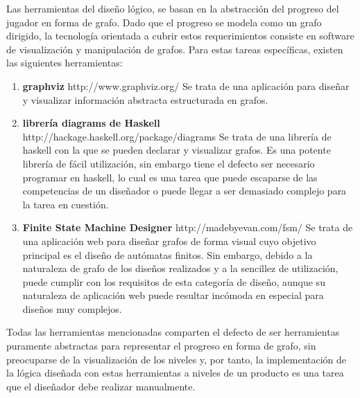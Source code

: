 Las herramientas del diseño lógico, se basan en la abstracción del progreso del jugador en forma de grafo.
Dado que el progreso se modela como un grafo dirigido, la tecnología orientada a cubrir estos requerimientos consiste en software de visualización y manipulación de grafos. Para estas tareas específicas, existen las siguientes herramientas:
\begin{enumerate}
	\item \textbf{graphviz} http://www.graphviz.org/ Se trata de una aplicación para diseñar y visualizar información abstracta estructurada en grafos.
	\item \textbf{librería diagrams de Haskell} http://hackage.haskell.org/package/diagrams Se trata de una librería de haskell con la que se pueden declarar y visualizar grafos. Es una potente librería de fácil utilización, sin embargo tiene el defecto ser necesario programar en haskell, lo cual es una tarea que puede escaparse de las competencias de un diseñador o puede llegar a ser demasiado complejo para la tarea en cuestión.
	\item \textbf{Finite State Machine Designer} http://madebyevan.com/fsm/ Se trata de una aplicación web para diseñar grafos de forma visual cuyo objetivo principal es el diseño de autómatas finitos. Sin embargo, debido a la naturaleza de grafo de los diseños realizados y a la sencillez de utilización, puede cumplir con los requisitos de esta categoría de diseño, aunque su naturaleza de aplicación web puede resultar incómoda en especial para diseños muy complejos.
\end{enumerate}
Todas las herramientas mencionadas comparten el defecto de ser herramientas puramente abstractas para representar el progreso en forma de grafo, sin preocuparse de la visualización de los niveles y, por tanto, la implementación de la lógica diseñada con estas herramientas a niveles de un producto es una tarea que el diseñador debe realizar manualmente.